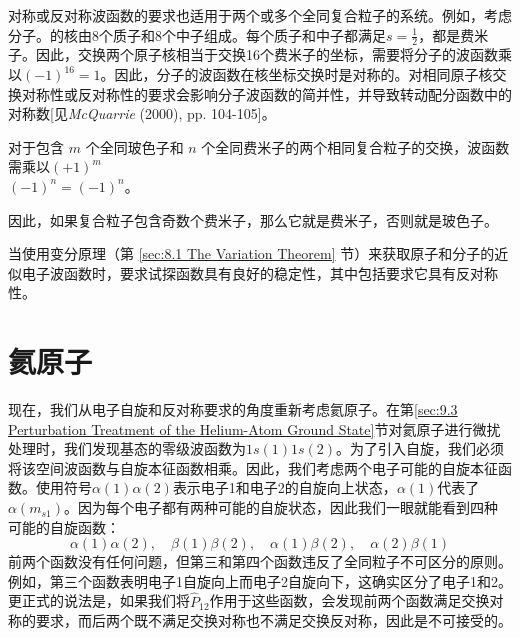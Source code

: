     对称或反对称波函数的要求也适用于两个或多个全同复合粒子的系统。例如，考虑分子。的核由8个质子和8个中子组成。每个质子和中子都满足$s = \frac{1}{2}$，都是费米子。因此，交换两个原子核相当于交换16个费米子的坐标，需要将分子的波函数乘以$\left(-1\right)^{16} = 1$。因此，分子的波函数在核坐标交换时是对称的。对相同原子核交换对称性或反对称性的要求会影响分子波函数的简并性，并导致转动配分函数中的对称数[见\textit{McQuarrie} (2000), pp. 104-105]。

    对于包含 $m$ 个全同玻色子和 $n$ 个全同费米子的两个相同复合粒子的交换，波函数需乘以$\left(+1\right)^m$\\$\left(-1\right)^n = \left(-1\right)^n$。

    因此，如果复合粒子包含奇数个费米子，那么它就是费米子，否则就是玻色子。

    当使用变分原理（第 \ref{sec:8.1 The Variation Theorem} 节）来获取原子和分子的近似电子波函数时，要求试探函数具有良好的稳定性，其中包括要求它具有反对称性。

\section{氦原子}
\label{sec:10.4 Th Helium Atom}

    现在，我们从电子自旋和反对称要求的角度重新考虑氦原子。在第\ref{sec:9.3 Perturbation Treatment of the Helium-Atom Ground State}节对氦原子进行微扰处理时，我们发现基态的零级波函数为$1s\left(1\right)1s\left(2\right)$。为了引入自旋，我们必须将该空间波函数与自旋本征函数相乘。因此，我们考虑两个电子可能的自旋本征函数。使用符号$\alpha\left(1\right)\alpha\left(2\right)$表示电子1和电子2的自旋向上状态，$\alpha\left(1\right)$代表了$\alpha\left(m_{s1}\right)$。因为每个电子都有两种可能的自旋状态，因此我们一眼就能看到四种可能的自旋函数：
    \begin{equation*}
        \alpha\left(1\right)\alpha\left(2\right), \quad \beta\left(1\right)\beta\left(2\right), \quad \alpha\left(1\right)\beta\left(2\right), \quad \alpha\left(2\right)\beta\left(1\right)
    \end{equation*}
    前两个函数没有任何问题，但第三和第四个函数违反了全同粒子不可区分的原则。例如，第三个函数表明电子1自旋向上而电子2自旋向下，这确实区分了电子1和2。更正式的说法是，如果我们将$\hat{P}_{12}$作用于这些函数，会发现前两个函数满足交换对称的要求，而后两个既不满足交换对称也不满足交换反对称，因此是不可接受的。

